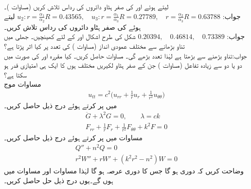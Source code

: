 \quad
{} لیتے ہوئے  اور  کی صفر ہٹاو دائروں کی رداس تلاش کریں (مساوات )۔\\
جواب:\quad
$u_2:r=\tfrac{\alpha_1}{\alpha_2}R=0.43565,\quad u_3:r=\tfrac{\alpha_1}{\alpha_3}R=0.27789, \quad r=\tfrac{\alpha_2}{\alpha_3}R=0.63788$
\quad
{} لیتے ہوئے  کی صفر ہٹاو دائروں کی رداس تلاش کریں۔\\
جواب:\quad
$0.20394, \quad 0.46814,\quad 0.73389$
\quad
شکل  کی طرح اشکال  اور  کے لئے کھینچیں۔
\quad
جھلی میں تناو بڑھانے سے مختلف عمودی انداز (مساوات ) کی تعدد پر کیا اثر پڑتا ہے؟\\
جواب:\quad تناو بڑھنے سے  بڑھتا ہے لہٰذا تعدد بڑھے گی۔
\quad 
مساوات  حاصل کریں۔
\quad
کیا مقررہ  اور  کی صورت میں دو یا دو سے زیادہ تفاعل  (مساوات ) جن کے صفر ہٹاو لکیریں مختلف ہوں کا ایک ہی امتیازی قدر ہو سکتا ہے؟
\quad {}\\
مساوات موج
\begin{align}\label{مساوات_جزوی_سوال_الف}
u_{tt}=c^2\big(u_{rr}+\frac{1}{r}u_r+\frac{1}{r^2}u_{\theta \theta}\big)
\end{align}
 میں  پر کرتے ہوئے درج ذیل حاصل کریں۔
\begin{align}
\ddot{G}+\lambda^2G=0,\quad \quad \lambda=ck\label{مساوات_جزوی_سوال_ب}\\
F_{rr}+\frac{1}{r}F_r+\frac{1}{r^2}F_{\theta\theta}+k^2F=0\label{مساوات_جزوی_سوال_پ}
\end{align}
\quad
مساوات  میں  پر کرتے ہوئے درج ذیل حاصل کریں۔
\begin{align}
Q''+n^2Q=0\label{مساوات_جزوی_سوال_ت}\\
r^2W''+rW'+(k^2r^2-n^2)W=0\label{مساوات_جزوی_سوال_ٹ}
\end{align}
\quad
وضاحت کریں کہ  دوری ہو گا جس کا دوری عرصہ  ہو گا لہٰذا مساوات  اور مساوات  میں  ہوں گے۔یوں درج ذیل حل حاصل کریں۔
